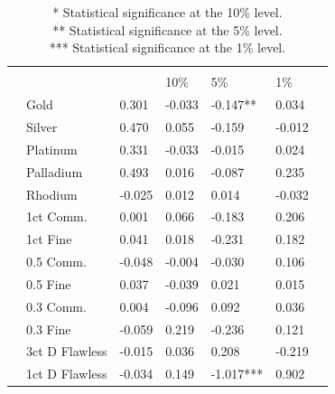 \documentclass[preprint,authoryear,11pt]{elsarticle}
\begin{document}
\begin{table}[htp!]
	\caption{\newline }
	\renewcommand\arraystretch{0.65}
	\begin{tabularx}{\linewidth}{*{6}{>{\raggedleft\arraybackslash\small}p{.14\linewidth}}S[table-format=1.3]}
		\hline
		 \\
		\hline
		&     &   &  \\
		&    &        & 10\% & 5\% & 1\% \\
		\hline
		 & Gold & 0.301 & -0.033 & -0.147** & 0.034 \\
		                            & Silver & 0.470 & 0.055 & -0.159 & -0.012 \\
		                            & Platinum & 0.331 & -0.033 & -0.015 & 0.024 \\
		                            & Palladium & 0.493 & 0.016 & -0.087 & 0.235 \\
		                            & Rhodium & -0.025 & 0.012 & 0.014 & -0.032\\
		\hline
		 & 1ct Comm. & 0.001 & 0.066 & -0.183 & 0.206 \\
		                          & 1ct Fine & 0.041 & 0.018 & -0.231 & 0.182 \\
		                          & 0.5 Comm. & -0.048 & -0.004 & -0.030 & 0.106 \\
		                          & 0.5 Fine & 0.037 & -0.039 & 0.021 & 0.015 \\
		                          & 0.3 Comm. & 0.004 & -0.096 & 0.092 & 0.036 \\
		                          & 0.3 Fine & -0.059 & 0.219 & -0.236 & 0.121 \\
		                          & 3ct D Flawless & -0.015 & 0.036 & 0.208 & -0.219 \\
		                          & 1ct D Flawless & -0.034 & 0.149 & -1.017*** & 0.902 \\
		\hline
	\end{tabularx}
	\caption*{\newline
	*   Statistical significance at the 10\% level.\\
	**  Statistical significance at the 5\% level.\\
	*** Statistical significance at the 1\% level.}
\end{table}
\end{document}
